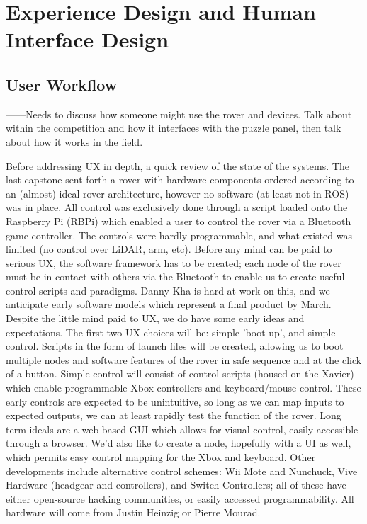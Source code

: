 \documentclass[a4paper, 10pt]{article}
\begin{document}
\pagebreak
	




\section{Experience Design and Human Interface Design}
	\subsection{User Workflow}
	------Needs to discuss how someone might use the rover and devices. Talk about within the competition and how it interfaces with the puzzle panel, then talk about how it works in the field. 
	
	Before addressing UX in depth, a quick review of the state of the systems. The last capstone sent forth a rover with hardware components ordered according to an (almost) ideal rover architecture, however no software (at least not in ROS) was in place. All control was exclusively done through a script loaded onto the Raspberry Pi (RBPi) which enabled a user to control the rover via a Bluetooth game controller. The controls were hardly programmable, and what existed was limited (no control over LiDAR, arm, etc). Before any mind can be paid to serious UX, the software framework has to be created; each node of the rover must be in contact with others via the Bluetooth to enable us to create useful control scripts and paradigms. Danny Kha is hard at work on this, and we anticipate early software models which represent a final product by March. 
Despite the little mind paid to UX, we do have some early ideas and expectations. The first two UX choices will be: simple 'boot up', and simple control. Scripts in the form of launch files will be created, allowing us to boot multiple nodes and software features of the rover in safe sequence and at the click of a button. Simple control will consist of control scripts (housed on the Xavier) which enable programmable Xbox controllers and keyboard/mouse control. These early controls are expected to be unintuitive, so long as we can map inputs to expected outputs, we can at least rapidly test the function of the rover. 
Long term ideals are a web-based GUI which allows for visual control, easily accessible through a browser. We'd also like to create a node, hopefully with a UI as well, which permits easy control mapping for the Xbox and keyboard. Other developments include alternative control schemes: Wii Mote and Nunchuck, Vive Hardware (headgear and controllers), and Switch Controllers; all of these have either open-source hacking communities, or easily accessed programmability. All hardware will come from Justin Heinzig or Pierre Mourad. 
\end{document}
